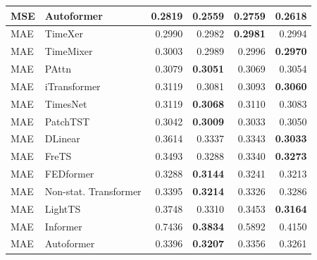 \begin{longtable}{llrrrr}
MSE & Autoformer & 0.2819 & \textbf{0.2559} & 0.2759 & 0.2618 \\
\midrule
MAE & TimeXer & 0.2990 & 0.2982 & \textbf{0.2981} & 0.2994 \\
MAE & TimeMixer & 0.3003 & 0.2989 & 0.2996 & \textbf{0.2970} \\
MAE & PAttn & 0.3079 & \textbf{0.3051} & 0.3069 & 0.3054 \\
MAE & iTransformer & 0.3119 & 0.3081 & 0.3093 & \textbf{0.3060} \\
MAE & TimesNet & 0.3119 & \textbf{0.3068} & 0.3110 & 0.3083 \\
MAE & PatchTST & 0.3042 & \textbf{0.3009} & 0.3033 & 0.3050 \\
MAE & DLinear & 0.3614 & 0.3337 & 0.3343 & \textbf{0.3033} \\
MAE & FreTS & 0.3493 & 0.3288 & 0.3340 & \textbf{0.3273} \\
MAE & FEDformer & 0.3288 & \textbf{0.3144} & 0.3241 & 0.3213 \\
MAE & Non-stat. Transformer & 0.3395 & \textbf{0.3214} & 0.3326 & 0.3286 \\
MAE & LightTS & 0.3748 & 0.3310 & 0.3453 & \textbf{0.3164} \\
MAE & Informer & 0.7436 & \textbf{0.3834} & 0.5892 & 0.4150 \\
MAE & Autoformer & 0.3396 & \textbf{0.3207} & 0.3356 & 0.3261 \\
\end{longtable}
\endgroup

